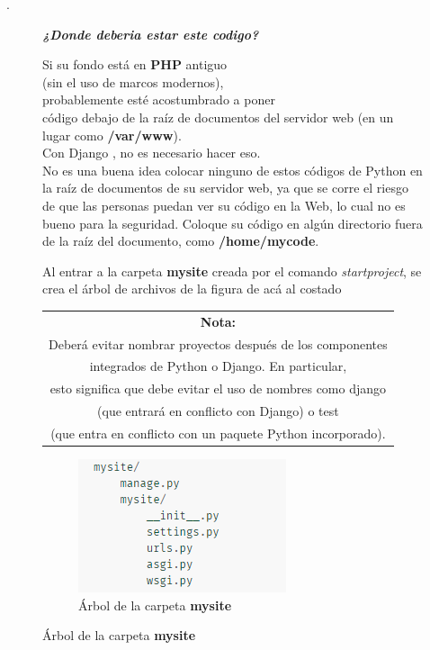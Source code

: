 \documentclass[10pt]{article}
\newcommand{\py}[1]{{\textcolor{B}{Python} #1}}
\newcommand{\django}[1]{{\textcolor{G}{Django} #1}}
\begin{document}
.


\begin{figure}[H]
	\begin{minipage}[b]{0.4\linewidth}
		\centering
		\textbf{\textit{¿Donde deberia estar este codigo?}}
			
Si su fondo está en \textbf{PHP} antiguo \\(sin el uso de marcos modernos),\\ probablemente esté acostumbrado a poner\\ código debajo de la raíz de documentos del servidor web (en un lugar como \textbf{/var/www}). \\
 Con \django{}, no es necesario hacer eso.\\ No es una buena idea colocar ninguno de estos códigos de \py{} en la raíz de documentos de su servidor web, ya que se corre el riesgo de que las personas puedan ver su código en la Web, lo cual no es bueno para la seguridad. Coloque su código en algún directorio fuera de la raíz del documento, como \textbf{/home/mycode}.

Al entrar a la carpeta \textbf{mysite} creada por el comando \textit{startproject}, se crea el árbol de archivos de la figura de acá al costado	
		\end{minipage}
		\hspace{0.5cm}	
	\begin{minipage}[b]{0.5\linewidth}
		\centering
		\begin{table}[H]
			\begin{tabular}{|c|}
	\hline \textbf{Nota:} \\
Deberá evitar nombrar proyectos después de los componentes\\ integrados de \py{} o Django. En particular,\\ esto significa que debe evitar el uso de nombres como django\\ (que entrará en conflicto con Django) o test\\ (que entra en conflicto con un paquete Python incorporado).\\ \hline 	
			\end{tabular}
		\end{table}
\begin{figure}[H]
  \begin{center}
  	 \includegraphics{figuras/3/31/311/img1.png}	 
	 \renewcommand{\arraystretch}{1.3}
	 \caption{Árbol de la carpeta \textbf{mysite}}
  \end{center}
\end{figure}
	\end{minipage}
\end{figure} 
\color{black}{}
\end{document}
